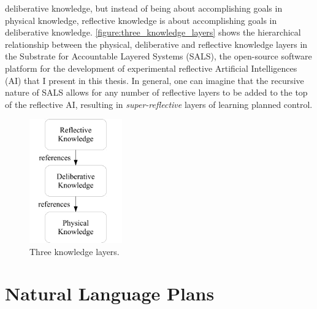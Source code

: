 deliberative knowledge, but instead of being about accomplishing goals
in physical knowledge, reflective knowledge is about accomplishing
goals in deliberative knowledge.
{\autoref{figure:three_knowledge_layers}} shows the hierarchical
relationship between the physical, deliberative and reflective
knowledge layers in the Substrate for Accountable Layered Systems
(SALS), the open-source software platform for the development of
experimental reflective Artificial Intelligences (AI) that I present
in this thesis.  In general, one can imagine that the recursive nature
of SALS allows for any number of reflective layers to be added to the
top of the reflective AI, resulting in \emph{super-reflective} layers
of learning planned control.
\begin{figure}
  \center
  \includegraphics[width=4cm]{gfx/three_knowledge_layers}
  \caption{Three knowledge layers.}
  \label{figure:three_knowledge_layers}
\end{figure}

\section{Natural Language Plans}

